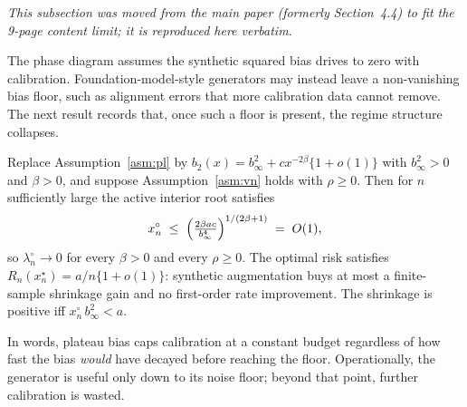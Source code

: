 \label{app:plateau}

\emph{This subsection was moved from the main paper (formerly Section~4.4) to fit the 9-page content limit; it is reproduced here verbatim.}

The phase diagram assumes the synthetic squared bias drives to zero with calibration. Foundation-model-style generators may instead leave a non-vanishing bias floor, such as alignment errors that more calibration data cannot remove. The next result records that, once such a floor is present, the regime structure collapses.

\begin{proposition}\label{prop:plateau}
Replace Assumption~\ref{asm:pl} by $b_2(x)=b_\infty^2+cx^{-2\beta}\{1+o(1)\}$ with $b_\infty^2>0$ and $\beta>0$, and suppose Assumption~\ref{asm:vn} holds with $\rho\ge 0$. Then for $n$ sufficiently large the active interior root satisfies
\begin{equation}\label{eq:xn-plateau}
  x_n^\circ\;\le\;\Bigl(\tfrac{2\beta a c}{b_\infty^4}\Bigr)^{1/(2\beta+1)}\;=\;O(1),
\end{equation}
so $\lambda_n^\circ\to 0$ for every $\beta>0$ and every $\rho\ge 0$. The optimal risk satisfies $R_n(x_n^\star)=a/n\{1+o(1)\}$: synthetic augmentation buys at most a finite-sample shrinkage gain and no first-order rate improvement. The shrinkage is positive iff $x_n^\circ\,b_\infty^2<a$.
\end{proposition}

In words, plateau bias caps calibration at a constant budget regardless of how fast the bias \emph{would} have decayed before reaching the floor. Operationally, the generator is useful only down to its noise floor; beyond that point, further calibration is wasted.
